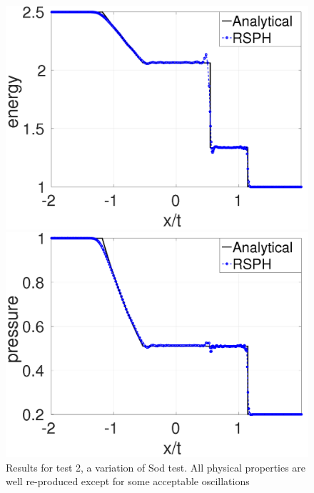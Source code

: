 \documentclass[review]{elsarticle}
\begin{document}
\begin{figure}[H]
\begin{minipage}{.415\textwidth}
        \includegraphics[width=0.99 \textwidth]{./Figures/GRod-RCM-e}
    \end{minipage}%
    \begin{minipage}{.415 \textwidth}
        \centering
        \includegraphics[width=0.99 \textwidth]{./Figures/GRod-RCM-p}
    \end{minipage}%
    \caption{Results for test 2, a variation of Sod test. All physical properties are well re-produced except for some acceptable oscillations}
    \label{fig:RCM-GSPH-Sod}
\end{figure}
\end{document}
